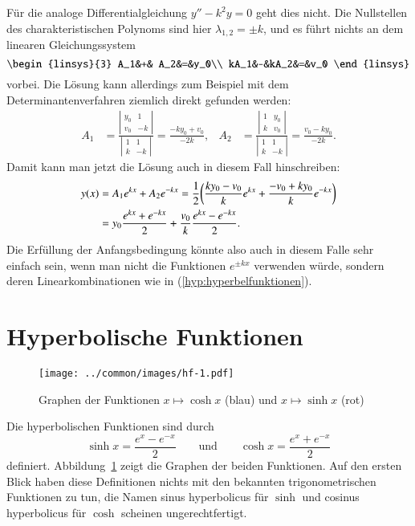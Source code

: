 \documentclass[a4paper,12pt]{article}
\begin{document}
Für die analoge Differentialgleichung $y''-k^2y=0$ geht dies nicht.
Die Nullstellen des charakteristischen Polynoms sind hier 
$\lambda_{1,2}=\pm k$, und es führt nichts an dem linearen Gleichungssystem
\[
\begin{linsys}{3}
 A_1&+& A_2&=&y_0\\
kA_1&-&kA_2&=&v_0
\end{linsys}
\]
vorbei.
Die Lösung kann allerdings zum Beispiel mit dem Determinantenverfahren
ziemlich direkt gefunden werden:
\begin{align*}
A_1
&=
\frac{\left|\begin{matrix}y_0&1\\v_0&-k\end{matrix}\right|}{\left|\begin{matrix}1&1\\k&-k\end{matrix}\right|}
=
\frac{-ky_0+v_0}{-2k},
&
A_2
&=
\frac{\left|\begin{matrix}1&y_0\\k&v_0\end{matrix}\right|}{\left|\begin{matrix}1&1\\k&-k\end{matrix}\right|}
=\frac{v_0-ky_0}{-2k}.
\end{align*}
Damit kann man jetzt die Lösung auch in diesem Fall hinschreiben:
\begin{align}
y(x)
&=
A_1e^{kx}+A_2e^{-kx}
=
\frac12\biggl(
\frac{ky_0-v_0}k e^{kx}
+
\frac{-v_0+ky_0}k e^{-kx}
\biggr)
\notag
\\
&=
y_0\frac{e^{kx}+e^{-kx}}2
+\frac{v_0}{k}\frac{e^{kx}-e^{-kx}}2.
\label{hyp:hyperbelfunktionen}
\end{align}
Die Erfüllung der Anfangsbedingung könnte also auch in diesem Falle
sehr einfach sein, wenn man nicht die Funktionen $e^{\pm kx}$ verwenden
würde, sondern deren Linearkombinationen wie in (\ref{hyp:hyperbelfunktionen}).

\section{Hyperbolische Funktionen}
\begin{figure}
\centering
\texttt{[image: ../common/images/hf-1.pdf]}
\caption{Graphen der Funktionen $x\mapsto\cosh x$ (blau)
und $x\mapsto\sinh x$ (rot)
\label{hyp:graphen}}
\end{figure}
Die hyperbolischen Funktionen sind durch
\[
\sinh x =\frac{e^x-e^{-x}}2
\qquad\text{und}\qquad
\cosh x = \frac{e^x+e^{-x}}2
\]
definiert.
Abbildung~\ref{hyp:graphen} zeigt die Graphen der beiden Funktionen.
Auf den ersten Blick haben diese Definitionen nichts mit den bekannten
trigonometrischen Funktionen zu tun, die Namen sinus hyperbolicus für
$\sinh$ und cosinus hyperbolicus für $\cosh$ scheinen ungerechtfertigt.
\end{document}
